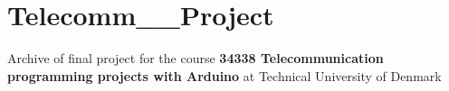 \chapter{Telecomm\+\_\+\_\+\+Project}
\hypertarget{md__r_e_a_d_m_e}{}\label{md__r_e_a_d_m_e}
\label{md__r_e_a_d_m_e_autotoc_md0}%
%


Archive of final project for the course {\bfseries{34338 Telecommunication programming projects with Arduino}} at Technical University of Denmark 